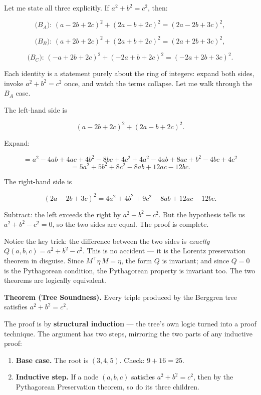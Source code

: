 \documentclass[11pt,openany]{book}
\theoremstyle{definition}
\theoremstyle{plain}
\theoremstyle{remark}
\begin{document}
Let me state all three explicitly. If $a^2 + b^2 = c^2$, then:

$$\text{($B_A$): } (a - 2b + 2c)^2 + (2a - b + 2c)^2 = (2a - 2b + 3c)^2,$$

$$\text{($B_B$): } (a + 2b + 2c)^2 + (2a + b + 2c)^2 = (2a + 2b + 3c)^2,$$

$$\text{($B_C$): } (-a + 2b + 2c)^2 + (-2a + b + 2c)^2 = (-2a + 2b + 3c)^2.$$

Each identity is a statement purely about the ring of integers: expand both sides, invoke $a^2 + b^2 = c^2$ once, and watch the terms collapse. Let me walk through the $B_A$ case.

The left-hand side is

$$(a - 2b + 2c)^2 + (2a - b + 2c)^2.$$

Expand:

$$= a^2 - 4ab + 4ac + 4b^2 - 8bc + 4c^2 + 4a^2 - 4ab + 8ac + b^2 - 4bc + 4c^2$$
$$= 5a^2 + 5b^2 + 8c^2 - 8ab + 12ac - 12bc.$$

The right-hand side is

$$(2a - 2b + 3c)^2 = 4a^2 + 4b^2 + 9c^2 - 8ab + 12ac - 12bc.$$

Subtract: the left exceeds the right by $a^2 + b^2 - c^2$. But the hypothesis tells us $a^2 + b^2 - c^2 = 0$, so the two sides are equal. The proof is complete.

Notice the key trick: the difference between the two sides is \textit{exactly} $Q(a, b, c) = a^2 + b^2 - c^2$. This is no accident — it is the Lorentz preservation theorem in disguise. Since $M^\top \eta\, M = \eta$, the form $Q$ is invariant; and since $Q = 0$ is the Pythagorean condition, the Pythagorean property is invariant too. The two theorems are logically equivalent.

\textbf{Theorem (Tree Soundness).} Every triple produced by the Berggren tree satisfies $a^2 + b^2 = c^2$.

The proof is by \textbf{structural induction} — the tree's own logic turned into a proof technique. The argument has two steps, mirroring the two parts of any inductive proof:

\begin{enumerate}
\item \textbf{Base case.} The root is $(3, 4, 5)$. Check: $9 + 16 = 25$. 
\item \textbf{Inductive step.} If a node $(a, b, c)$ satisfies $a^2 + b^2 = c^2$, then by the Pythagorean Preservation theorem, so do its three children.
\end{enumerate}
\end{document}
